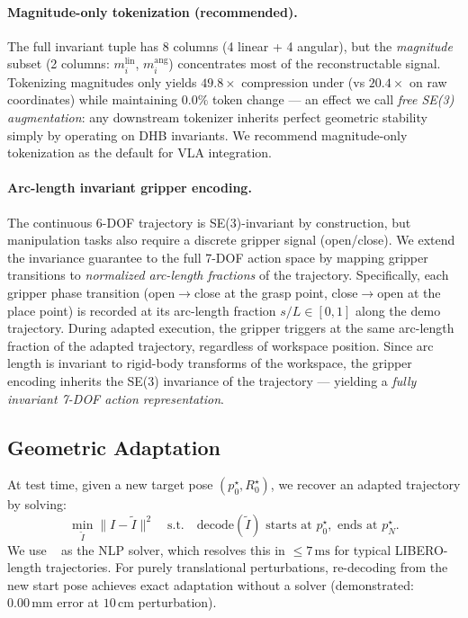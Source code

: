 \paragraph{Magnitude-only tokenization (recommended).}
The full invariant tuple has 8 columns (4 linear + 4 angular), but
the \emph{magnitude} subset (2 columns: $m_i^\text{lin}$, $m_i^\text{ang}$)
concentrates most of the reconstructable signal.
Tokenizing magnitudes only yields $49.8\times$ compression under \fast{} (vs
$20.4\times$ on raw coordinates) while maintaining $0.0\%$ token change ---
an effect we call \emph{free SE(3) augmentation}: any downstream tokenizer
inherits perfect geometric stability simply by operating on DHB invariants.
We recommend magnitude-only tokenization as the default for VLA integration.

\paragraph{Arc-length invariant gripper encoding.}
The continuous 6-DOF trajectory is SE(3)-invariant by construction, but
manipulation tasks also require a discrete gripper signal (open/close).
We extend the invariance guarantee to the full 7-DOF action space by
mapping gripper transitions to \emph{normalized arc-length fractions}
of the trajectory.
Specifically, each gripper phase transition (open$\to$close at the grasp point,
close$\to$open at the place point) is recorded at its arc-length fraction
$s/L \in [0,1]$ along the demo trajectory.
During adapted execution, the gripper triggers at the same arc-length
fraction of the adapted trajectory, regardless of workspace position.
Since arc length is invariant to rigid-body transforms of the workspace,
the gripper encoding inherits the SE(3) invariance of the trajectory ---
yielding a \emph{fully invariant 7-DOF action representation}.

\subsection{Geometric Adaptation}
\label{sec:adaptation}

At test time, given a new target pose $(p^\star_0, R^\star_0)$,
we recover an adapted trajectory by solving:
\begin{equation}
\min_{\tilde I} \|I - \tilde I\|^2 \quad \text{s.t.} \quad
\mathrm{decode}(\tilde I) \text{ starts at } p^\star_0, \text{ ends at } p^\star_N.
\end{equation}
We use \fatrop{}~\cite{vanroye2023fatrop} as the NLP solver,
which resolves this in $\leq\!7\,\text{ms}$ for typical LIBERO-length trajectories.
For purely translational perturbations, re-decoding from the new start pose
achieves exact adaptation without a solver (demonstrated: $0.00\,\text{mm}$ error
at $10\,\text{cm}$ perturbation).

